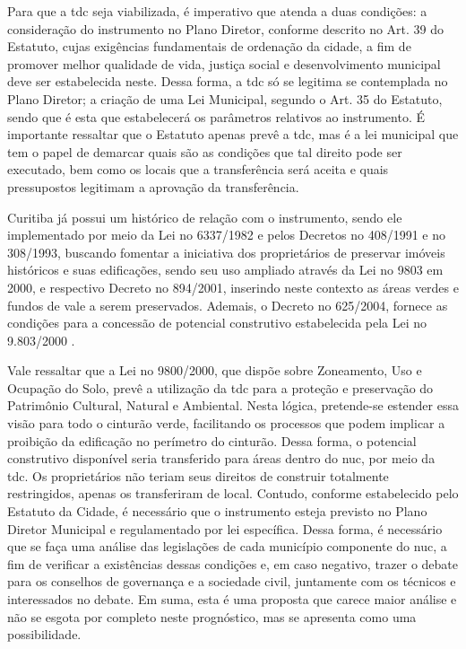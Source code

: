 	Para que a \glsdesc{tdc} seja viabilizada, é imperativo que atenda a duas condições: a consideração do instrumento no Plano Diretor, conforme descrito no Art. 39 do Estatuto, cujas exigências fundamentais de ordenação da cidade, a fim de promover melhor qualidade de vida, justiça social e desenvolvimento municipal deve ser estabelecida neste. Dessa forma, a \gls{tdc} só se legitima se contemplada no Plano Diretor; a criação de uma Lei Municipal, segundo o Art. 35 do Estatuto, sendo que é esta que estabelecerá os parâmetros relativos ao instrumento. É importante ressaltar que o Estatuto apenas prevê a \gls{tdc}, mas é a lei municipal que tem o papel de demarcar quais são as condições que tal direito pode ser executado, bem como os locais que a transferência será aceita e quais pressupostos legitimam a aprovação da transferência.
	
	Curitiba já possui um histórico de relação com o instrumento, sendo ele implementado por meio da Lei no 6337/1982 e pelos Decretos no 408/1991 e no 308/1993, buscando fomentar a iniciativa dos proprietários de preservar imóveis históricos e suas edificações, sendo seu uso ampliado através da Lei no 9803 em 2000, e respectivo Decreto no 894/2001, inserindo neste contexto as áreas verdes e fundos de vale a serem preservados. Ademais, o Decreto no 625/2004, fornece as condições para a concessão de potencial construtivo estabelecida pela Lei no 9.803/2000 \cite{bacellar2007a}.
	
	Vale ressaltar que a Lei no 9800/2000, que dispõe sobre Zoneamento, Uso e Ocupação do Solo, prevê a utilização da \gls{tdc} para a proteção e preservação do Patrimônio Cultural, Natural e Ambiental. Nesta lógica, pretende-se estender essa visão para todo o cinturão verde, facilitando os processos que podem implicar a proibição da edificação no perímetro do cinturão. Dessa forma, o potencial construtivo disponível seria transferido para áreas dentro do \gls{nuc}, por meio da \gls{tdc}. Os proprietários não teriam seus direitos de construir totalmente restringidos, apenas os transferiram de local. Contudo, conforme estabelecido pelo Estatuto da Cidade, é necessário que o instrumento esteja previsto no Plano Diretor Municipal e regulamentado por lei específica. Dessa forma, é necessário que se faça uma análise das legislações de cada município componente do \gls{nuc}, a fim de verificar a existências dessas condições e, em caso negativo, trazer o debate para os conselhos de governança e a sociedade civil, juntamente com os técnicos e interessados no debate. Em suma, esta é uma proposta que carece maior análise e não se esgota por completo neste prognóstico, mas se apresenta como uma possibilidade. 
	
